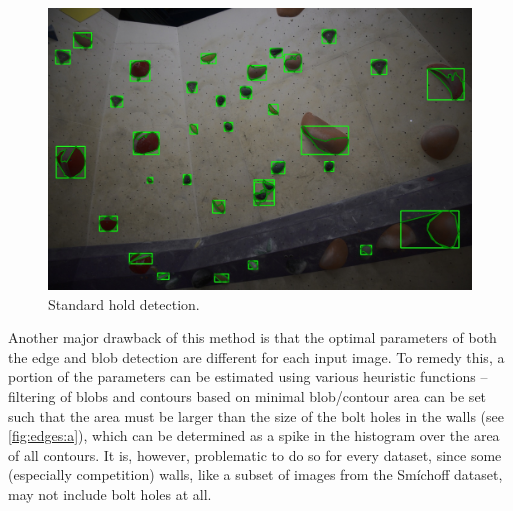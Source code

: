 \documentclass[final]{cvpr}
\begin{document}
\begin{figure}[t]
\centering
\includegraphics[width = \linewidth]{img/combined/2-holds.jpg}
\caption{Standard hold detection.}
\label{fig:holds}
\end{figure}

Another major drawback of this method is that the optimal parameters of both the edge and blob detection are different for each input image.
To remedy this, a portion of the parameters can be estimated using various heuristic functions -- filtering of blobs and contours based on minimal blob/contour area can be set such that the area must be larger than the size of the bolt holes in the walls (see \autoref{fig:edges:a}), which can be determined as a spike in the histogram over the area of all contours.
It is, however, problematic to do so for every dataset, since some (especially competition) walls, like a subset of images from the Smíchoff dataset, may not include bolt holes at all.
\end{document}
